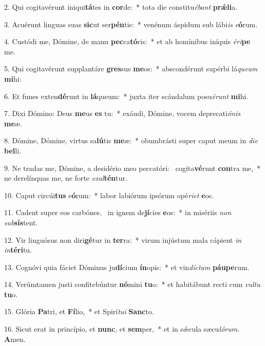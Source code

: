 2. Qui cogitavérunt iniqui\textbf{tá}tes in \textbf{cor}de:~*  tota die constitu\textit{é}\textit{bant} \textbf{prǽ}\textbf{li}a.\

3. Acuérunt linguas suas \textbf{sic}ut ser\textbf{pén}tis:~*  venénum áspidum sub lábi\textit{is} \textit{e}\textbf{ó}rum.\

4. Custódi me, Dómine, de manu \textbf{pec}ca\textbf{tó}ris:~*  et ab homínibus iníquis \textit{é}\textit{ri}\textbf{pe} me.\

5. Qui cogitavérunt supplantáre \textbf{gres}sus \textbf{me}os:~*  abscondérunt supérbi lá\textit{que}\textit{um} \textbf{mi}hi:\

6. Et funes exten\textbf{dé}runt in \textbf{lá}queum:~*  juxta iter scándalum posu\textit{é}\textit{runt} \textbf{mi}hi.\

7. Dixi Dómino: Deus \textbf{me}us \textbf{es} tu:~*  exáudi, Dómine, vocem deprecati\textit{ó}\textit{nis} \textbf{me}æ.\

8. Dómine, Dómine, virtus sa\textbf{lú}tis \textbf{me}æ:~*  obumbrásti super caput meum in \textit{di}\textit{e} \textbf{bel}li.\

9. Ne tradas me, Dómine, a desidério meo peccatóri: \dag\  cogita\textbf{vé}runt \textbf{con}tra me,~*  ne derelínquas me, ne forte \textit{ex}\textit{al}\textbf{tén}tur.\

10. Caput circúi\textbf{tus} e\textbf{ó}rum:~*  labor labiórum ipsórum opé\textit{ri}\textit{et} \textbf{e}os.\

11. Cadent super eos carbónes, \dag\  in ignem de\textbf{jí}cies \textbf{e}os:~*  in misériis \textit{non} \textit{sub}\textbf{sís}tent.\

12. Vir linguósus non diri\textbf{gé}tur in \textbf{ter}ra:~*  virum injústum mala cápient \textit{in} \textit{in}\textbf{tér}\textbf{i}tu.\

13. Cognóvi quia fáciet Dóminus ju\textbf{dí}cium \textbf{ín}opis:~*  et vin\textit{díc}\textit{tam} \textbf{páu}\textbf{pe}rum.\

14. Verúmtamen justi confitebúntur \textbf{nó}mini \textbf{tu}o:~*  et habitábunt recti cum \textit{vul}\textit{tu} \textbf{tu}o.\

15. Glória \textbf{Pa}tri, et \textbf{Fí}lio,~*  et Spirí\textit{tu}\textit{i} \textbf{Sanc}to.\

16. Sicut erat in princípio, et \textbf{nunc}, et \textbf{sem}per,~*  et in sǽcula sæcu\textit{ló}\textit{rum}. \textbf{A}men.\

